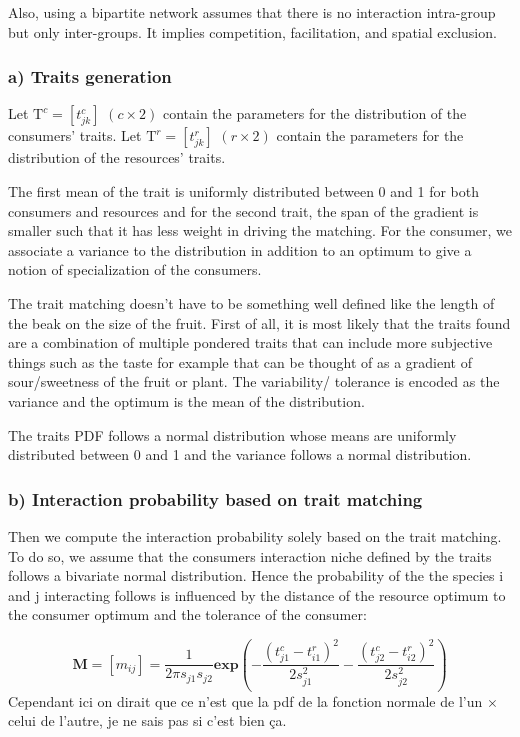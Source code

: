 Also, using a bipartite network assumes that there is no interaction intra-group but only inter-groups. It implies competition, facilitation, and spatial exclusion.




\subsubsection{a) Traits generation}
Let $\textrm{T}^c = [t^c_{jk}]$ $(c \times 2)$ contain the parameters for the distribution of the consumers' traits. 
Let $\textrm{T}^r = [t^r_{jk}]$ $(r \times 2)$ contain the parameters for the distribution of the resources' traits. 

The first mean of the trait is uniformly distributed between 0 and 1 for both consumers and resources and for the second trait, the span of the gradient is smaller such that it has less weight in driving the matching. 
For the consumer, we associate a variance to the distribution in addition to an optimum to give a notion of specialization of the consumers.

The trait matching doesn't have to be something well defined like the length of the beak on the size of the fruit. First of all, it is most likely that the traits found are a combination of multiple pondered traits that can include more subjective things such as the taste for example that can be thought of as a gradient of sour/sweetness of the fruit or plant.
The variability/ tolerance is encoded as the variance and the optimum is the mean of the distribution.

The traits PDF follows a normal distribution whose means are uniformly distributed between 0 and 1 and the variance follows a normal distribution.




\subsubsection{b) Interaction probability based on trait matching}
Then we compute the interaction probability  solely based on the trait matching. To do so, we assume that the consumers interaction niche defined by the traits follows a bivariate normal distribution. Hence the probability of the the species i and j interacting follows is influenced by the distance of the resource optimum to the consumer optimum and the tolerance of the consumer:

$$\textbf{M} = [m_{ij}]=\frac{1}{2\pi s_{j1}s_{j2}} \textbf{exp}\left(-\frac{(t^c_{j1} - t^r_{i1})^2}{2s^2_{j1}} - \frac{(t^c_{j2} - t^r_{i2})^2}{2s^2_{j2}}\right)$$
Cependant ici on dirait que ce n'est que la pdf de la fonction normale de l'un $\times$ celui de l'autre, je ne sais pas si c'est bien ça.





